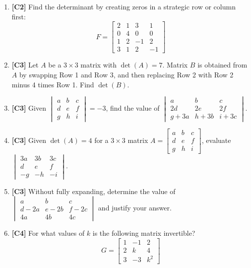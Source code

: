 \documentclass[11pt]{article}
\begin{document}
\begin{enumerate}
    \item \textbf{[C2]} Find the determinant by creating zeros in a strategic row or column first:
    \[ F = \begin{bmatrix} 2 & 1 & 3 & 1 \\ 0 & 4 & 0 & 0 \\ 1 & 2 & -1 & 2 \\ 3 & 1 & 2 & -1 \end{bmatrix} \]

    \item \textbf{[C3]} Let $A$ be a $3 \times 3$ matrix with $\det(A) = 7$. Matrix $B$ is obtained from $A$ by swapping Row 1 and Row 3, and then replacing Row 2 with Row 2 minus 4 times Row 1. Find $\det(B)$.

    \item \textbf{[C3]} Given $\begin{vmatrix} a & b & c \\ d & e & f \\ g & h & i \end{vmatrix} = -3$, find the value of $\begin{vmatrix} a & b & c \\ 2d & 2e & 2f \\ g+3a & h+3b & i+3c \end{vmatrix}$.

    \item \textbf{[C3]} Given $\det(A) = 4$ for a $3 \times 3$ matrix $A = \begin{bmatrix} a & b & c \\ d & e & f \\ g & h & i \end{bmatrix}$, evaluate $\begin{vmatrix} 3a & 3b & 3c \\ d & e & f \\ -g & -h & -i \end{vmatrix}$.

    \item \textbf{[C3]} Without fully expanding, determine the value of $\begin{vmatrix} a & b & c \\ d-2a & e-2b & f-2c \\ 4a & 4b & 4c \end{vmatrix}$ and justify your answer.

    \item \textbf{[C4]} For what values of $k$ is the following matrix invertible?
    \[ G = \begin{bmatrix} 1 & -1 & 2 \\ 2 & k & 4 \\ 3 & -3 & k^2 \end{bmatrix} \]


\end{enumerate}
\end{document}
